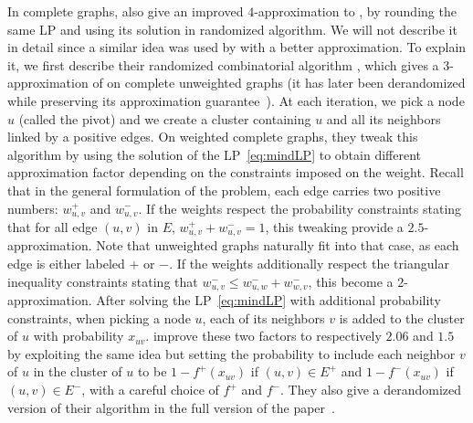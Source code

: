 In complete graphs, \textcite[Section 3]{Charikar2003} also give an improved $4$-approximation to
\mind{}, by rounding the same LP and using its solution in randomized algorithm. We will not
describe it in detail since a similar idea was used by \textcite{CCPivotConf05} with a better
approximation. To explain it, we first describe their randomized combinatorial algorithm \ccpivot{},
which gives a $3$-approximation of \mind{} on complete unweighted graphs (it has later been
derandomized while preserving its approximation guarantee~\autocite{derandomCCPivot08}). At each
iteration, we pick a node $u$ \uar{} (called the pivot) and we create a cluster containing $u$ and all its neighbors
linked by a positive edges. On weighted complete graphs, they tweak this algorithm by using the
solution of the  LP~\eqref{eq:mindLP} to obtain different approximation factor depending on the
constraints imposed on the weight. Recall that in the general formulation of the problem, each
edge carries two positive numbers: $w_{u,v}^+$ and $w_{u,v}^-$. If the weights respect the
probability constraints stating that for all edge $(u,v)$ in $E$, $w_{u,v}^+ + w_{u,v}^- = 1$, this
tweaking provide a $2.5$-approximation. Note that unweighted graphs naturally fit into that case, as
each edge is either labeled $+$ or $-$. If the weights
additionally respect the triangular inequality constraints stating that $w_{u,v}^- \leq w_{u,w}^- +
w_{w,v}^-$, this become a $2$-approximation. After solving the LP~\eqref{eq:mindLP} with additional
probability constraints, when picking a node $u$, each of its neighbors $v$ is added to the cluster
of $u$ with probability $x_{uv}$. \Textcite{Chawla2014} improve these two factors to respectively
$2.06$ and $1.5$ by exploiting the same idea but setting the probability to include each neighbor
$v$ of $u$ in the cluster of $u$ to be $1-f^+(x_{uv})$ if $(u,v)\in E^+$ and $1-f^-(x_{uv})$ if
$(u,v)\in E^-$, with a careful choice of $f^+$ and $f^-$. They also give a derandomized version of
their algorithm in the full version of the paper~\autocite[Theorem 23]{ChawlaArxiv14}.

